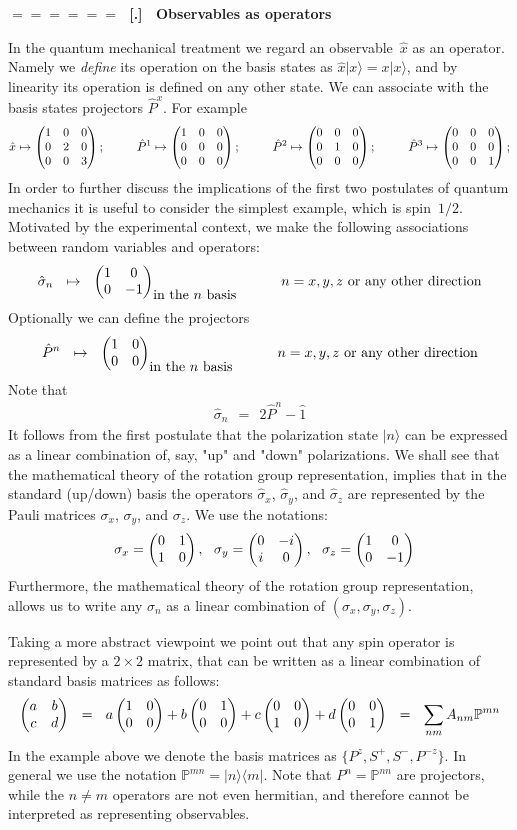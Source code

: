 \documentclass[onecolumn,fleqn]{revtex4}
\newcommand{\amatrix}[1]{\begin{matrix} #1 \end{matrix}}
\newcommand{\beq}{\begin{eqnarray}}
\newcommand{\eeq}{\end{eqnarray}}
\renewcommand{\thesubsection}{\arabic{subsection}}
\renewcommand{\thesubsubsection}{\arabic{subsubsection}}
\newcommand{\sheadC}[1]
{
\addtocounter{subsubsection}{1}
\vspace{5mm}
{\Large\bf $=\!=\!=\!=\!=\!=\;$ [\thesubsection.\thesubsubsection] \ #1}  
\nopagebreak
\phantomsection
}
\begin{document}
 
\sheadC{Observables as operators}

In the quantum mechanical treatment 
we regard an observable~$\hat{x}$ as an operator.
Namely we {\em define} its operation on 
the basis states as $\hat{x}|x\rangle=x|x\rangle$, 
and by linearity its operation is defined on any other state.
We can associate with the basis states projectors $\hat{P}^x$.
For example  
\beq
\hat{x} \mapsto \left( \amatrix{1&0&0 \cr 0&2&0 \cr 0&0&3}\right);  
\ \ \ \ \ \ \ \
\hat{P}^1 \mapsto \left( \amatrix{1&0&0 \cr 0&0&0 \cr 0&0&0}\right);
\ \ \ \ \ \ \ \
\hat{P}^2 \mapsto \left( \amatrix{0&0&0 \cr 0&1&0 \cr 0&0&0}\right);
\ \ \ \ \ \ \ \
\hat{P}^3 \mapsto \left( \amatrix{0&0&0 \cr 0&0&0 \cr 0&0&1}\right);
\eeq
In order to further discuss the implications of the first two postulates 
of quantum mechanics it is useful to consider the simplest example, which is spin~$1/2$.
Motivated by the experimental context, we make the following associations between random variables and operators:
\beq
\hat{\sigma}_n \ \ \mapsto \ \ \left( \amatrix{1&0 \cr 0&-1}\right)_{\mbox{in the $n$ basis}} 
\ \ \ \ \ \ \ \ \ \mbox{$n=x,y,z$ or any other direction}
\eeq
Optionally we can define the projectors 
\beq
\hat{P}^n \ \ \mapsto \ \ \left( \amatrix{1&0 \cr 0&0}\right)_{\mbox{in the $n$ basis}} 
\ \ \ \ \ \ \ \ \ \mbox{$n=x,y,z$ or any other direction}
\eeq
Note that 
\beq
\hat{\sigma}_n \ \ = \ \ 2\hat{P}^n -\hat{1}
\eeq
It follows from the first postulate that the polarization state $|n\rangle$ 
can be expressed as a linear combination of, say, "up" and "down" polarizations. 
We shall see that the mathematical theory of the rotation group representation, 
implies that in the standard (up/down) basis 
the operators $\hat{\sigma}_x$, $\hat{\sigma}_y$, and $\hat{\sigma}_z$
are represented by the Pauli matrices $\sigma_x$, $\sigma_y$, and $\sigma_z$. 
We use the notations: 
\beq
\ \ \sigma_x = \left(\amatrix{0&1\cr 1&0}\right), 
\ \ \sigma_y = \left(\amatrix{0&-i\cr i&0}\right), 
\ \ \sigma_z = \left(\amatrix{1&0\cr 0&-1}\right)
\eeq
Furthermore, the mathematical theory of the rotation group representation,    
allows us to write any $\sigma_n$ as a linear combination of ${(\sigma_x, \sigma_y, \sigma_z)}$.  
  

Taking a more abstract viewpoint we point out that any spin operator 
is represented by a ${2\times 2}$ matrix, 
that can be written as a linear combination of standard basis matrices as follows:
\beq
\left( \amatrix{a&b\cr c&d}\right)
\ \ = \ \ a  \left(\amatrix{1&0\cr 0&0}\right) 
+ b  \left(\amatrix{0&1\cr 0&0}\right) 
+ c \left(\amatrix{0&0\cr 1&0}\right) 
+ d  \left(\amatrix{0&0\cr 0&1} \right) 
\ \ = \ \ 
\sum_{nm} A_{nm} \mathbb{P}^{mn} 
\eeq
In the example above we denote the basis matrices  
as ${ \{P^{z},S^{+},S^{-},P^{-z}\} }$.
In general we use the notation $\mathbb{P}^{mn} = |n\rangle\langle m|$. 
Note that ${P^n = \mathbb{P}^{nn}}$ are projectors, 
while the $n\ne m$ operators are not even hermitian, 
and therefore cannot be interpreted as representing observables.   
\end{document}
